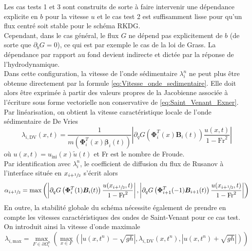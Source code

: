 \documentclass[11pt, a4paper, oneside]{report}
\begin{document}
Les cas tests 1 et 3 sont construits de sorte à faire intervenir une dépendance explicite en $b$ pour la vitesse $u$ et le cas test 2 est suffisamment lisse pour qu'un flux centré soit stable pour le schéma RKDG. \\
Cependant, dans le cas général, le flux $G$ ne dépend pas explicitement de $b$ (de sorte que $\partial_b G = 0$), ce qui est par exemple le cas de la loi de Grass. La dépendance par rapport au fond devient indirecte et dictée par la réponse de l'hydrodynamique. \\
Dans cette configuration, la vitesse de l'onde sédimentaire $\lambda_i^n$ ne peut plus être obtenue directement par la formule \eqref{eq:Vitesse_onde_sedimentaire}. Elle doit alors être exprimée à partir des valeurs propres de la Jacobienne associée à l'écriture sous forme vectorielle non conservative de \eqref{eq:Saint_Venant_Exner}. \\
Par linéarisation, on obtient la vitesse caractéristique locale de l'onde sédimentaire de De Vries
\begin{equation}
    \lambda_{i, \text{DV}}(x, t) = \frac{1}{m \left( \bm{\Phi}_i^T(x) \bm{\beta}_i(t) \right)} \left| \partial_q G \left( \bm{\Phi}_i^T(x) \bm{B}_i(t) \right) \frac{u(x, t)}{1 - \text{Fr}^2} \right|
\end{equation}
où $u(x, t) = u_\text{ini}(x) \widetilde{u}(t)$ et Fr est le nombre de Froude. \\
Par identification avec $\lambda_i^n$, le coefficient de diffusion du flux de Rusanov à l'interface située en $x_{i+\sfrac{1}{2}}$ s'écrit alors
\begin{equation}
    \alpha_{i + \sfrac{1}{2}} = \max \left( \left| \partial_q G \left( \bm{\Phi}_i^T(1) \bm{B}_i(t) \right) \frac{u(x_{i + \sfrac{1}{2}}, t)}{1 - \text{Fr}^2} \right|, \left| \partial_q G \left( \bm{\Phi}_{i+1}^T(-1) \bm{B}_{i+1}(t) \right) \frac{u(x_{i + \sfrac{1}{2}}, t)}{1 - \text{Fr}^2} \right| \right)
\end{equation}
En outre, la stabilité globale du schéma nécessite également de prendre en compte les vitesses caractéristiques des ondes de Saint-Venant pour ce cas test. \\
On introduit ainsi la vitesse d'onde maximale
\begin{equation}
    \lambda_{i, \text{max}} = \max_{F \in \partial \Omega_i^n} \left( \max_{x \in F} \left( \left| u(x, t^n) - \sqrt{g h} \right|, \lambda_{i, \text{DV}}(x, t^n), \left| u(x, t^n) + \sqrt{g h} \right| \right) \right)
\end{equation}
\end{document}
